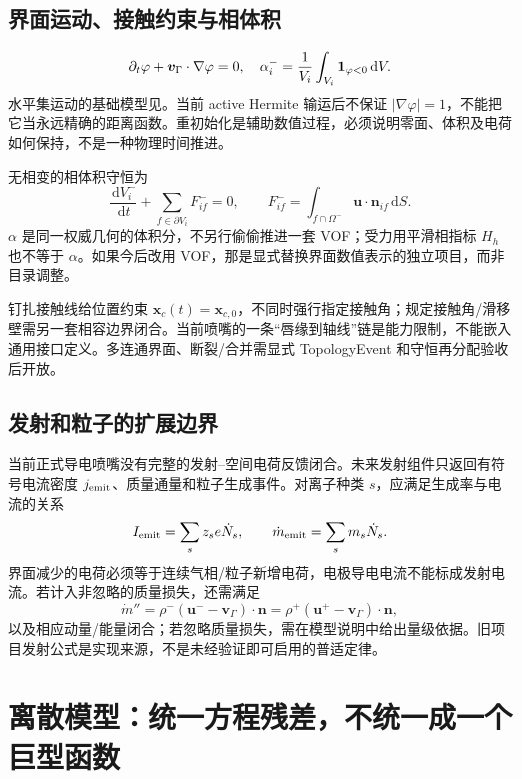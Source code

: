\documentclass[UTF8,a4paper,11pt,fontset=fandol]{ctexart}
\numberwithin{equation}{section}
\newcommand{\dd}{\,\mathrm{d}}
\newcommand{\uu}{\bm u}
\newcommand{\nn}{\bm n}
\begin{document}
\subsection{界面运动、接触约束与相体积}\label{sec:lsmodel}
\begin{equation}
 \partial_t\varphi+\bm v_\Gamma\cdot\nabla\varphi=0,\quad
 \alpha_i^- = \frac{1}{V_i}\int_{V_i}{\bf1}_{\varphi<0}\dd V.\label{eq:ls}
\end{equation}
水平集运动的基础模型见\cite{osher}。当前 active Hermite 输运后不保证 $|\nabla\varphi|=1$，不能把它当永远精确的距离函数。重初始化是辅助数值过程，必须说明零面、体积及电荷如何保持，不是一种物理时间推进。

无相变的相体积守恒为
\begin{equation}
 \frac{\dd V_i^-}{\dd t}+\sum_{f\in\partial V_i}F^-_{if}=0,\qquad
 F^-_{if}=\int_{f\cap\Omega^-}\uu\cdot\nn_{if}\dd S.\label{eq:phasevolume}
\end{equation}
$\alpha$ 是同一权威几何的体积分，不另行偷偷推进一套 VOF；受力用平滑相指标 $H_h$ 也不等于 $\alpha$。如果今后改用 VOF，那是显式替换界面数值表示的独立项目，而非目录调整。

钉扎接触线给位置约束 $\bm x_c(t)=\bm x_{c,0}$，不同时强行指定接触角；规定接触角/滑移壁需另一套相容边界闭合。当前喷嘴的一条“唇缘到轴线”链是能力限制，不能嵌入通用接口定义。多连通界面、断裂/合并需显式 TopologyEvent 和守恒再分配验收后开放。

\subsection{发射和粒子的扩展边界}
当前正式导电喷嘴没有完整的发射--空间电荷反馈闭合。未来发射组件只返回有符号电流密度 $j_{\rm emit}$、质量通量和粒子生成事件。对离子种类 $s$，应满足生成率与电流的关系
\begin{equation}
 I_{\rm emit}=\sum_s z_s e\dot N_s,\qquad
 \dot m_{\rm emit}=\sum_s m_s\dot N_s.
\end{equation}
界面减少的电荷必须等于连续气相/粒子新增电荷，电极导电电流不能标成发射电流。若计入非忽略的质量损失，还需满足
\begin{equation}
 \dot m''=\rho^-(\uu^- -\bm v_\Gamma)\cdot\nn
 =\rho^+(\uu^+ -\bm v_\Gamma)\cdot\nn,
\end{equation}
以及相应动量/能量闭合；若忽略质量损失，需在模型说明中给出量级依据。旧项目发射公式是实现来源，不是未经验证即可启用的普适定律。

\section{离散模型：统一方程残差，不统一成一个巨型函数}\label{sec:discrete}
\end{document}
